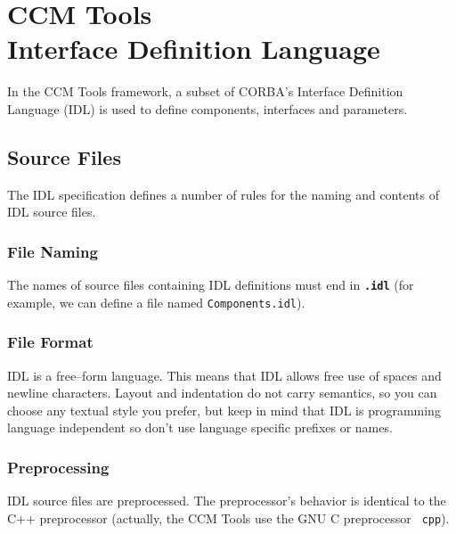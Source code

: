 \chapter{CCM Tools\\Interface Definition Language}

In the CCM Tools framework, a subset of CORBA's Interface Definition Language
(IDL) is used to define components, interfaces and parameters.

\newpage
\section{Source Files}
The IDL specification defines a number of rules for the naming and contents of
IDL source files.

\subsection{File Naming}
The names of source files containing IDL definitions must end in {\bf \tt .idl}
(for example, we can define a file named {\tt Components.idl}).

\subsection{File Format}
IDL is a free--form language. This means that IDL allows free use of spaces
and newline characters.
Layout and indentation do not carry semantics, so you can choose any textual
style you prefer, but keep in mind that IDL is programming language independent
so don't use language specific prefixes or names.
 

\subsection{Preprocessing}
IDL source files are preprocessed. The preprocessor's behavior is identical to
the C++ preprocessor (actually, the CCM Tools use the GNU C preprocessor {\tt 
cpp}).

